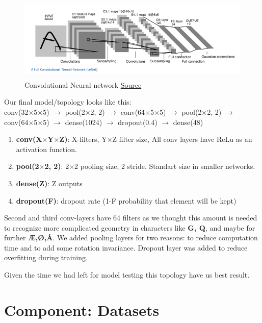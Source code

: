 \documentclass[Report.tex]{subfiles}
\begin{document}
\begin{figure}[H]
  \centering
  \includegraphics[height=4cm]{res/LeNet.png}
  \caption{Convolutional Neural network \href{https://adeshpande3.github.io/A-Beginner\%27s-Guide-To-Understanding-Convolutional-Neural-Networks/}{Source}}
  \label{fig:CNN_architecture}
\end{figure}
\begin{flushleft}
Our final model/topology looks like this:\\
conv(32$\times$5$\times$5) $\rightarrow$ pool(2$\times$2, 2) $\rightarrow$ conv(64$\times$5$\times$5) $\rightarrow$ pool(2$\times$2, 2) $\rightarrow$ conv(64$\times$5$\times$5) $\rightarrow$ dense(1024) $\rightarrow$ dropout(0.4) $\rightarrow$ dense(48)

\begin{enumerate}
\item \textbf{conv(X$\times$Y$\times$Z)}: X-filters, Y$\times$Z filter size, All conv layers have ReLu as an activation function.
\item \textbf{pool(2$\times$2, 2)}: 2$\times$2 pooling size, 2 stride. Standart size in smaller networks.
\item \textbf{dense(Z)}: Z outputs
\item \textbf{dropout(F)}: dropout rate (1-F probability that element will be kept)
\end{enumerate}

Second and third conv-layers have 64 filters as we thought this amount is needed to recognize more complicated geometry in characters like \textbf{G, Q}, and maybe for further \textbf{Æ,Ø,Å}.
We added pooling layers for two reasons: to reduce computation time and to add some rotation invariance.
Dropout layer was added to reduce overfitting during training.

Given the time we had left for model testing this topology have us best result. 
\end{flushleft}


\section{Component: Datasets}
\label{Method:Datasets}
\end{document}
